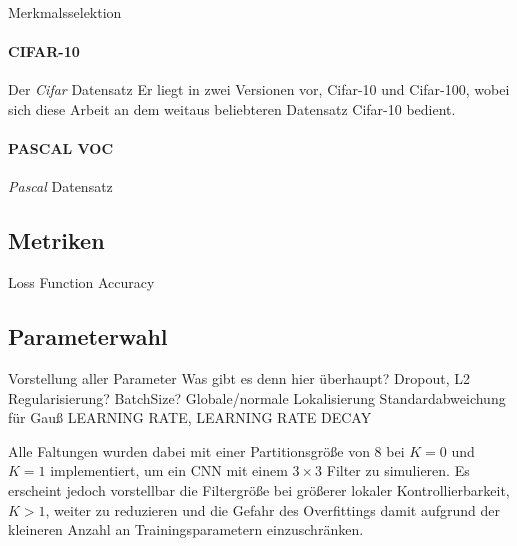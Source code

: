 Merkmalsselektion













\paragraph{CIFAR-10}
\label{cifar_10}

\cite{cifar_10}

Der \emph{\gls{Cifar}} Datensatz
Er liegt in zwei Versionen vor, \gls{Cifar}-10 und \gls{Cifar}-100, wobei sich diese Arbeit an dem weitaus beliebteren Datensatz \gls{Cifar}-10 bedient.





\paragraph{PASCAL VOC}
\label{pascal_voc}

\emph{\gls{Pascal}} Datensatz
\cite{pascal_voc}



\subsection{Metriken}
\label{metriken}

Loss Function
Accuracy

\subsection{Parameterwahl}
\label{parameterwahl}

Vorstellung aller Parameter
Was gibt es denn hier überhaupt?
Dropout, L2 Regularisierung?
BatchSize?
Globale/normale Lokalisierung
Standardabweichung für Gauß
LEARNING RATE, LEARNING RATE DECAY

Alle Faltungen wurden dabei mit einer Partitionsgröße von $8$ bei $K=0$ und $K=1$ implementiert, um ein \gls{CNN} mit einem $3 \times 3$ Filter zu simulieren.
Es erscheint jedoch vorstellbar die Filtergröße bei größerer lokaler Kontrollierbarkeit, \dhe{} $K > 1$, weiter zu reduzieren und die Gefahr des Overfittings damit aufgrund der kleineren Anzahl an Trainingsparametern einzuschränken.

